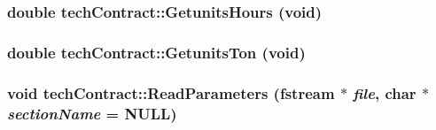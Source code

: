 \label{classtech_contract_aff7221c0f1f8bcdcd55f4ca03aae1c08}
\hypertarget{classtech_contract_a1f31c1df80da35dcbe325f27aa6f8f1f}{
\subsubsection[{GetunitsHours}]{\setlength{\rightskip}{0pt plus 5cm}double techContract::GetunitsHours (void)}}
\label{classtech_contract_a1f31c1df80da35dcbe325f27aa6f8f1f}
\hypertarget{classtech_contract_a68c58331d271c2495b4c69fa74148b06}{
\subsubsection[{GetunitsTon}]{\setlength{\rightskip}{0pt plus 5cm}double techContract::GetunitsTon (void)}}
\label{classtech_contract_a68c58331d271c2495b4c69fa74148b06}
\hypertarget{classtech_contract_ae2669826bdb3931c603d00e288011fff}{
\subsubsection[{ReadParameters}]{\setlength{\rightskip}{0pt plus 5cm}void techContract::ReadParameters (fstream $\ast$ {\em file}, \/  char $\ast$ {\em sectionName} = {\ttfamily NULL})}}
\label{classtech_contract_ae2669826bdb3931c603d00e288011fff}


